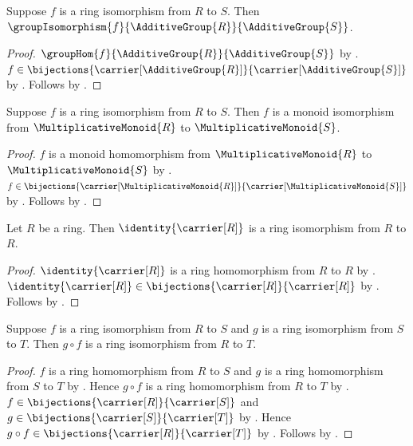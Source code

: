 \begin{proposition}\label{ring_isomorphism_is_additive_group_isomorphism}
    Suppose $f$ is a ring isomorphism from $R$ to $S$.
    Then $\groupIsomorphism{f}{\AdditiveGroup{R}}{\AdditiveGroup{S}}$.
\end{proposition}
\begin{proof}
    $\groupHom{f}{\AdditiveGroup{R}}{\AdditiveGroup{S}}$ by
        .
    $f\in\bijections{\carrier[\AdditiveGroup{R}]}{
        \carrier[\AdditiveGroup{S}]}$ by
        .
    Follows by .
\end{proof}

\begin{proposition}\label{ring_isomorphism_is_multiplicative_monoid_isomorphism}
    Suppose $f$ is a ring isomorphism from $R$ to $S$.
    Then $f$ is a monoid isomorphism from
        $\MultiplicativeMonoid{R}$ to $\MultiplicativeMonoid{S}$.
\end{proposition}
\begin{proof}
    $f$ is a monoid homomorphism from $\MultiplicativeMonoid{R}$ to
        $\MultiplicativeMonoid{S}$ by
        .
    $f\in\bijections{\carrier[\MultiplicativeMonoid{R}]}{
        \carrier[\MultiplicativeMonoid{S}]}$ by
        .
    Follows by .
\end{proof}

\begin{proposition}\label{identity_ring_isomorphism}
    Let $R$ be a ring.
    Then $\identity{\carrier[R]}$ is a ring isomorphism from $R$ to $R$.
\end{proposition}
\begin{proof}
    $\identity{\carrier[R]}$ is a ring homomorphism from $R$ to $R$ by
        .
    $\identity{\carrier[R]}\in
        \bijections{\carrier[R]}{\carrier[R]}$ by
        .
    Follows by .
\end{proof}

\begin{theorem}\label{ring_isomorphism_composition}
    Suppose $f$ is a ring isomorphism from $R$ to $S$ and
        $g$ is a ring isomorphism from $S$ to $T$.
    Then $g\circ f$ is a ring isomorphism from $R$ to $T$.
\end{theorem}
\begin{proof}
    $f$ is a ring homomorphism from $R$ to $S$ and
        $g$ is a ring homomorphism from $S$ to $T$ by
        .
    Hence $g\circ f$ is a ring homomorphism from $R$ to $T$ by
        .
    $f\in\bijections{\carrier[R]}{\carrier[S]}$ and
        $g\in\bijections{\carrier[S]}{\carrier[T]}$ by
        .
    Hence $g\circ f\in\bijections{\carrier[R]}{\carrier[T]}$ by
        .
    Follows by .
\end{proof}

